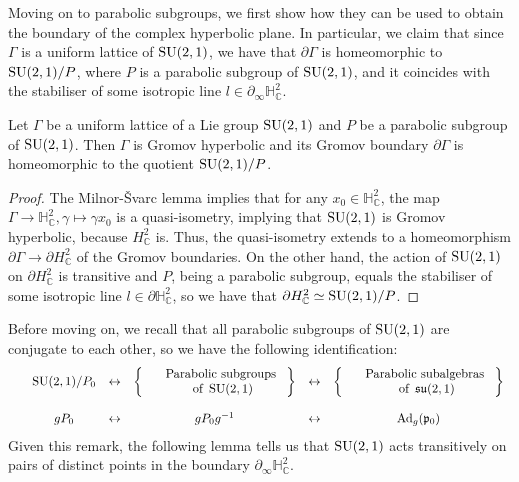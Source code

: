 \documentclass{report}
\begin{document}
Moving on to parabolic subgroups, we first show how they can be used to obtain the boundary of the complex hyperbolic plane.
In particular, we claim that since $\Gamma$ is a uniform lattice of $\operatorname{{\mathrm{SU}}}(2,1)$, we have that $\partial \Gamma$ is homeomorphic to $\operatorname{{\mathrm{SU}}}(2,1)/P$, where $P$ is a parabolic subgroup of $\operatorname{{\mathrm{SU}}}(2,1)$, and it coincides with the stabiliser of some isotropic line $l \in \partial_\infty \mathbb H^2_\mathbb C$.

\begin{lemma}\label{lem:lattice_boundary}
    Let $\Gamma$ be a uniform lattice of a Lie group $\operatorname{{\mathrm{SU}}}(2,1)$ and $P$ be a parabolic subgroup of $\operatorname{{\mathrm{SU}}}(2,1)$.
    Then $\Gamma$ is Gromov hyperbolic and its Gromov boundary $\partial \Gamma$ is homeomorphic to the quotient $\operatorname{{\mathrm{SU}}}(2,1)/P$.  
\end{lemma}
\begin{proof}
    The Milnor-Švarc lemma implies that for any $x_0 \in \mathbb H^2_{\mathbb C}$, the map $\Gamma \to \mathbb H^2_{\mathbb C}, \gamma \mapsto \gamma x_0$ is a quasi-isometry, implying that $\operatorname{{\mathrm{SU}}}(2,1)$ is Gromov hyperbolic, because $H^2_{\mathbb C}$ is.
    Thus, the quasi-isometry extends to a homeomorphism $\partial \Gamma \to \partial H^2_{\mathbb C}$ of the Gromov boundaries.
    On the other hand, the action of $\operatorname{{\mathrm{SU}}}(2,1)$ on $\partial H^2_\mathbb C$ is transitive and $P$, being a parabolic subgroup, equals the stabiliser of some isotropic line $l \in \partial \mathbb H^2_{\mathbb C}$, so we have that $\partial H^2_{\mathbb C} \simeq \operatorname{{\mathrm{SU}}}(2,1)/P$.
\end{proof}
Before moving on, we recall that all parabolic subgroups of $\operatorname{{\mathrm{SU}}}(2,1)$ are conjugate to each other, so we have the following identification:
\[
\begin{array}{cccccc}
    &\operatorname{{\mathrm{SU}}}(2,1)/{P_0} &\leftrightarrow &    \left\{ \begin{array}{cc}
        &\text{ Parabolic subgroups }\\
        &\text{ of } \operatorname{{\mathrm{SU}}}(2,1)
    \end{array} \right\}
 &\leftrightarrow &    \left\{ \begin{array}{cc}
    &\text{ Parabolic subalgebras }\\
    &\text{ of } \operatorname{{\mathfrak{su}}}(2,1)
\end{array} \right\}
\\~\\
    &g P_0 &\leftrightarrow &g P_0 g^{-1} &\leftrightarrow &\operatorname{Ad}_g(\mathfrak p_0)
\end{array}
\]
Given this remark, the following lemma tells us that $\operatorname{{\mathrm{SU}}}(2,1)$ acts transitively on pairs of distinct points in the boundary $\partial_\infty \mathbb H^2_{\mathbb C}$.
\end{document}
